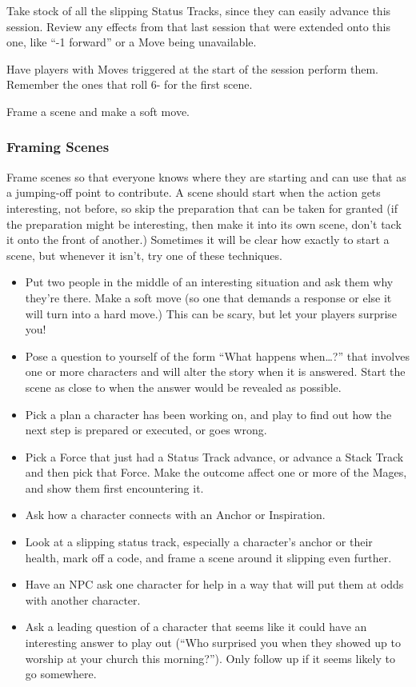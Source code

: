 \documentclass[
]{article}
\begin{document}
Take stock of all the slipping Status Tracks, since they can easily
advance this session. Review any effects from that last session that
were extended onto this one, like ``-1 forward'' or a Move being
unavailable.

Have players with Moves triggered at the start of the session perform
them. Remember the ones that roll 6- for the first scene.

Frame a scene and make a soft move.

\hypertarget{framing-scenes}{%
\subsubsection{Framing Scenes}\label{framing-scenes}}

Frame scenes so that everyone knows where they are starting and can use
that as a jumping-off point to contribute. A scene should start when the
action gets interesting, not before, so skip the preparation that can be
taken for granted (if the preparation might be interesting, then make it
into its own scene, don't tack it onto the front of another.) Sometimes
it will be clear how exactly to start a scene, but whenever it isn't,
try one of these techniques.

\begin{itemize}
\item
  Put two people in the middle of an interesting situation and ask them
  why they're there. Make a soft move (so one that demands a response or
  else it will turn into a hard move.) This can be scary, but let your
  players surprise you!
\item
  Pose a question to yourself of the form ``What happens when\ldots?''
  that involves one or more characters and will alter the story when it
  is answered. Start the scene as close to when the answer would be
  revealed as possible.
\item
  Pick a plan a character has been working on, and play to find out how
  the next step is prepared or executed, or goes wrong.
\item
  Pick a Force that just had a Status Track advance, or advance a Stack
  Track and then pick that Force. Make the outcome affect one or more of
  the Mages, and show them first encountering it.
\item
  Ask how a character connects with an Anchor or Inspiration.
\item
  Look at a slipping status track, especially a character's anchor or
  their health, mark off a code, and frame a scene around it slipping
  even further.
\item
  Have an NPC ask one character for help in a way that will put them at
  odds with another character.
\item
  Ask a leading question of a character that seems like it could have an
  interesting answer to play out (``Who surprised you when they showed
  up to worship at your church this morning?''). Only follow up if it
  seems likely to go somewhere.
\end{itemize}
\end{document}
